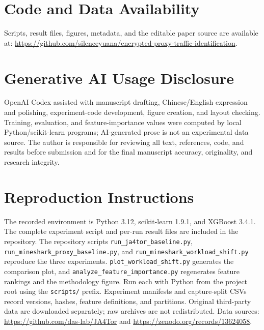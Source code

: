 \documentclass[conference]{IEEEtran}
\begin{document}
\section{Code and Data Availability}
Scripts, result files, figures, metadata, and the editable paper source are available at:\newline
\url{https://github.com/silenceyuana/encrypted-proxy-traffic-identification}.

\section{Generative AI Usage Disclosure}
OpenAI Codex assisted with manuscript drafting, Chinese/English expression and polishing, experiment-code development, figure creation, and layout checking. Training, evaluation, and feature-importance values were computed by local Python/scikit-learn programs; AI-generated prose is not an experimental data source. The author is responsible for reviewing all text, references, code, and results before submission and for the final manuscript accuracy, originality, and research integrity.


\appendix
\section{Reproduction Instructions}
The recorded environment is Python 3.12, scikit-learn 1.9.1, and XGBoost 3.4.1. The complete experiment script and per-run result files are included in the repository. The repository scripts \texttt{run\_ja4tor\_baseline.py}, \texttt{run\_mineshark\_proxy\_baseline.py}, and \texttt{run\_mineshark\_workload\_shift.py} reproduce the three experiments. \texttt{plot\_workload\_shift.py} generates the comparison plot, and \texttt{analyze\_feature\_importance.py} regenerates feature rankings and the methodology figure. Run each with Python from the project root using the \texttt{scripts/} prefix. Experiment manifests and capture-split CSVs record versions, hashes, feature definitions, and partitions. Original third-party data are downloaded separately; raw archives are not redistributed. Data sources: \url{https://github.com/das-lab/JA4Tor} and \url{https://zenodo.org/records/13624058}.
\end{document}
